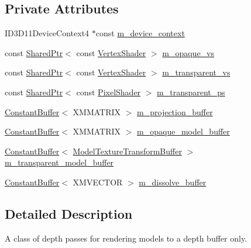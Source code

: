 \subsection*{Private Attributes}
\begin{DoxyCompactItemize}
\item 
I\+D3\+D11\+Device\+Context4 $\ast$const \hyperlink{classmage_1_1_depth_pass_a900800a2d00c1855523a77ec488221fe}{m\+\_\+device\+\_\+context}
\item 
const \hyperlink{namespacemage_a1e01ae66713838a7a67d30e44c67703e}{Shared\+Ptr}$<$ const \hyperlink{classmage_1_1_vertex_shader}{Vertex\+Shader} $>$ \hyperlink{classmage_1_1_depth_pass_aa410d0303d18d621a7894695b87ccfc2}{m\+\_\+opaque\+\_\+vs}
\item 
const \hyperlink{namespacemage_a1e01ae66713838a7a67d30e44c67703e}{Shared\+Ptr}$<$ const \hyperlink{classmage_1_1_vertex_shader}{Vertex\+Shader} $>$ \hyperlink{classmage_1_1_depth_pass_a0227142e9867e0599c770bdbe0c2241c}{m\+\_\+transparent\+\_\+vs}
\item 
const \hyperlink{namespacemage_a1e01ae66713838a7a67d30e44c67703e}{Shared\+Ptr}$<$ const \hyperlink{namespacemage_a27ecaf266420ee7a494d64edc0757129}{Pixel\+Shader} $>$ \hyperlink{classmage_1_1_depth_pass_a5b6a53892db2e9d9fd1a21c3b8cf6d19}{m\+\_\+transparent\+\_\+ps}
\item 
\hyperlink{structmage_1_1_constant_buffer}{Constant\+Buffer}$<$ X\+M\+M\+A\+T\+R\+IX $>$ \hyperlink{classmage_1_1_depth_pass_a4c9833ceaf223b73404edab4cf81b7c1}{m\+\_\+projection\+\_\+buffer}
\item 
\hyperlink{structmage_1_1_constant_buffer}{Constant\+Buffer}$<$ X\+M\+M\+A\+T\+R\+IX $>$ \hyperlink{classmage_1_1_depth_pass_a4e466580656eb0602d2e00c29b2435a0}{m\+\_\+opaque\+\_\+model\+\_\+buffer}
\item 
\hyperlink{structmage_1_1_constant_buffer}{Constant\+Buffer}$<$ \hyperlink{structmage_1_1_model_texture_transform_buffer}{Model\+Texture\+Transform\+Buffer} $>$ \hyperlink{classmage_1_1_depth_pass_a4b6a38c56e02b6185c1eef8bcaaa5786}{m\+\_\+transparent\+\_\+model\+\_\+buffer}
\item 
\hyperlink{structmage_1_1_constant_buffer}{Constant\+Buffer}$<$ X\+M\+V\+E\+C\+T\+OR $>$ \hyperlink{classmage_1_1_depth_pass_ab8ef293d922a965a92825b8226b9d87c}{m\+\_\+dissolve\+\_\+buffer}
\end{DoxyCompactItemize}


\subsection{Detailed Description}
A class of depth passes for rendering models to a depth buffer only. 

